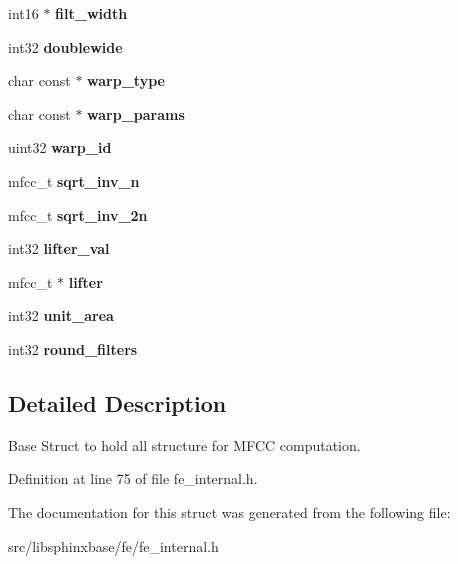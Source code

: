 \begin{DoxyCompactItemize}
\item 
int16 $\ast$ {\bfseries filt\-\_\-width}\label{structmelfb__s_a43c26968a65602f1dce3c02e155eea39}

\item 
int32 {\bfseries doublewide}\label{structmelfb__s_a2f1a3b5e9a985a88dd0a0c57c8e8e682}

\item 
char const $\ast$ {\bfseries warp\-\_\-type}\label{structmelfb__s_a925f6f7a98b33b542f6b53f7c0b1b923}

\item 
char const $\ast$ {\bfseries warp\-\_\-params}\label{structmelfb__s_aa7ba71c21972a822ba7f23391ff92b21}

\item 
uint32 {\bfseries warp\-\_\-id}\label{structmelfb__s_a3b4d756c484accf39aeac42219b2c7ec}

\item 
mfcc\-\_\-t {\bfseries sqrt\-\_\-inv\-\_\-n}\label{structmelfb__s_a1d222190206f979da6f1297197bb6e6b}

\item 
mfcc\-\_\-t {\bfseries sqrt\-\_\-inv\-\_\-2n}\label{structmelfb__s_a09439f191bdf50d17505f0cfcabda229}

\item 
int32 {\bfseries lifter\-\_\-val}\label{structmelfb__s_a605228aea9e9c9028caad09060a07b2e}

\item 
mfcc\-\_\-t $\ast$ {\bfseries lifter}\label{structmelfb__s_a362672e537cb316c538fccc141ad01f8}

\item 
int32 {\bfseries unit\-\_\-area}\label{structmelfb__s_a9fc76cc06249cb211c35c04a31c8a3c1}

\item 
int32 {\bfseries round\-\_\-filters}\label{structmelfb__s_ac2db1578287bd1f5a9b5eed94cc0d987}

\end{DoxyCompactItemize}


\subsection{Detailed Description}
Base Struct to hold all structure for M\-F\-C\-C computation. 



Definition at line 75 of file fe\-\_\-internal.\-h.



The documentation for this struct was generated from the following file\-:\begin{DoxyCompactItemize}
\item 
src/libsphinxbase/fe/fe\-\_\-internal.\-h\end{DoxyCompactItemize}

